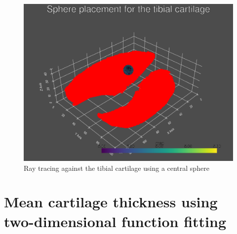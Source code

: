 \begin{figure}[htb!]
	\centering
	\includegraphics[width=\linewidth]{./figures/tibial_sphere}
	\caption{Ray tracing against the tibial cartilage using a central sphere}
	\label{fig:tibial_sphere}
\end{figure}

\section{Mean cartilage thickness using two-dimensional function fitting}
\label{sec:Function_fitting}
